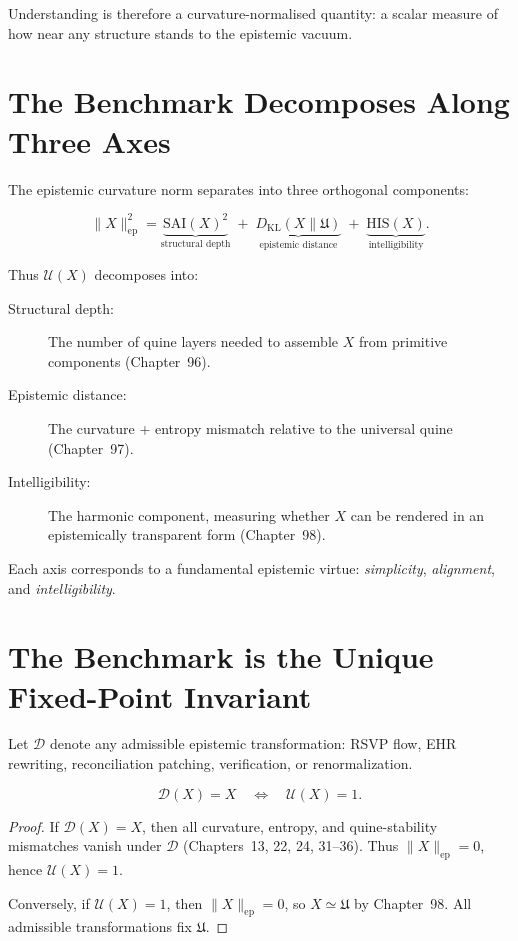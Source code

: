 Understanding is therefore a curvature-normalised quantity:
a scalar measure of how near any structure stands to the epistemic vacuum.

\section{The Benchmark Decomposes Along Three Axes}

The epistemic curvature norm separates into three orthogonal components:

\[
\|X\|_{\mathrm{ep}}^2
  =
  \underbrace{\mathrm{SAI}(X)^2}_{\text{structural depth}}
  \;+\;
  \underbrace{D_{\mathrm{KL}}(X\|\mathfrak{U})}_{\text{epistemic distance}}
  \;+\;
  \underbrace{\mathrm{HIS}(X)}_{\text{intelligibility}}.
\]

Thus $\mathcal{U}(X)$ decomposes into:

\begin{description}
\item[Structural depth:]
The number of quine layers needed to assemble $X$
from primitive components (Chapter~96).

\item[Epistemic distance:]
The curvature + entropy mismatch relative to the universal quine
(Chapter~97).

\item[Intelligibility:]
The harmonic component, measuring whether $X$ can be rendered
in an epistemically transparent form (Chapter~98).
\end{description}

Each axis corresponds to a fundamental epistemic virtue:
\emph{simplicity}, \emph{alignment}, and \emph{intelligibility}.

\section{The Benchmark is the Unique Fixed-Point Invariant}

Let $\mathscr{D}$ denote any admissible epistemic transformation:
RSVP flow, EHR rewriting, reconciliation patching,
verification, or renormalization.

\begin{theorem}
\[
\mathscr{D}(X)=X
\quad\Longleftrightarrow\quad
\mathcal{U}(X)=1.
\]
\end{theorem}

\begin{proof}
If $\mathscr{D}(X)=X$, then all curvature, entropy,
and quine-stability mismatches vanish under $\mathscr{D}$
(Chapters~13, 22, 24, 31--36).
Thus $\|X\|_{\mathrm{ep}}=0$, hence $\mathcal{U}(X)=1$.

Conversely, if $\mathcal{U}(X)=1$, then $\|X\|_{\mathrm{ep}}=0$,
so $X\simeq\mathfrak{U}$ by Chapter~98.  
All admissible transformations fix $\mathfrak{U}$.
\end{proof}

